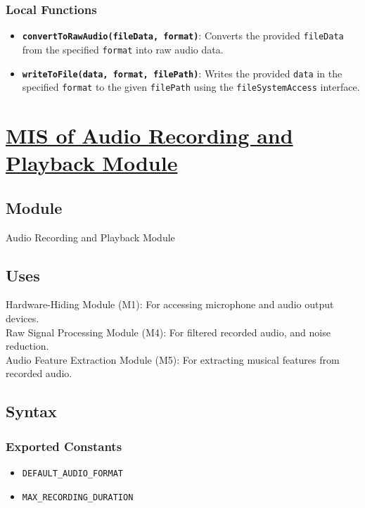 \documentclass[12pt, titlepage]{article}
\begin{document}
\subsubsection{Local Functions}
\begin{itemize}
    \item \textbf{\texttt{convertToRawAudio(fileData, format)}}: Converts the provided \texttt{fileData} from the specified \texttt{format} into raw audio data.
    \item \textbf{\texttt{writeToFile(data, format, filePath)}}: Writes the provided \texttt{data} in the specified \texttt{format} to the given \texttt{filePath} using the \texttt{fileSystemAccess} interface.
\end{itemize}


\section{\hyperref[mARP]{MIS of Audio Recording and Playback Module}} \label{M7}  

\subsection{Module}  
Audio Recording and Playback Module  

\subsection{Uses}  
Hardware-Hiding Module (M1): For accessing microphone and audio output devices. \\
Raw Signal Processing Module (M4): For filtered recorded audio, and noise reduction. \\
Audio Feature Extraction Module (M5): For extracting musical features from recorded audio. \\

\subsection{Syntax}  

\subsubsection{Exported Constants}  
\begin{itemize}
    \item \texttt{DEFAULT\_AUDIO\_FORMAT}  
    \item \texttt{MAX\_RECORDING\_DURATION}  
\end{itemize}  
\end{document}
